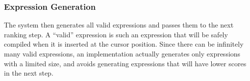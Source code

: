 \documentclass[PRO,english]{ipsj}
\begin{document}
\subsubsection{Expression Generation}
The system then generates all valid expressions and passes them to the next ranking step.  A ``valid'' expression is such an expression that will be safely compiled when it is inserted at the cursor position.  Since there can be infinitely many valid expressions, an implementation actually generates only expressions with a limited size, and avoids generating expressions that will have lower scores in the next step.









\end{document}
